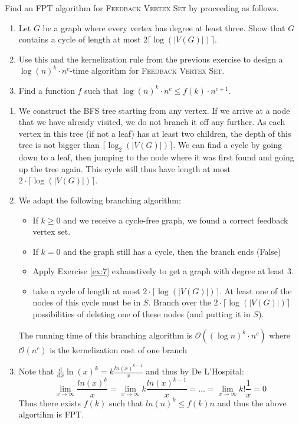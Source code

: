 \documentclass{article}
\begin{document}
\newpage
\begin{exercise}
    Find an FPT algorithm for \textsc{Feedback Vertex Set} by proceeding as follows.\begin{enumerate}
        \item Let $G$ be a graph where every vertex has degree at least three. Show that $G$ contains a cycle of length at most $2\lceil\log(|V(G)|)\rceil$.
        \item Use this and the kernelization rule from the previous exercise to design a $\log(n)^k\cdot n^c$-time algorithm for \textsc{Feedback Vertex Set}.
        \item Find a function $f$ such that $\log(n)^k\cdot n^c\leq f(k)\cdot n^{c+1}$.
    \end{enumerate}
\end{exercise}
\begin{solving}
    \begin{enumerate}
        \item We construct the BFS tree starting from any vertex. If we arrive at a node that we have already visited, we do not branch it off any further. As each vertex in this tree (if not a leaf) has at least two children, the depth of this tree is not bigger than $\lceil\log_2(|V(G)|)\rceil$. We can find a cycle by going down to a leaf, then jumping to the node where it was first found and going up the tree again. This cycle will thus have length at most  $2\cdot\lceil\log(|V(G)|)\rceil$.
        \item We adapt the following branching algorithm:
        \begin{itemize}
            \item If $k\geq 0$ and we receive a cycle-free graph, we found a correct feedback vertex set.
            \item If $k= 0$ and the graph still has a cycle, then the branch ends (False)
            \item Apply Exercise \ref{ex:7} exhaustively to get a graph with degree at least $3$.
            \item take a cycle of length at most $2\cdot\lceil\log(|V(G)|)\rceil$. At least one of the nodes of this cycle must be in $S$. Branch over the $2\cdot\lceil\log(|V(G)|)\rceil$ possibilities of deleting one of these nodes (and putting it in $S$).
        \end{itemize}
        The running time of this branching algorithm is $\mathcal O((\log n)^k\cdot n^c)$ where $\mathcal O(n^c)$ is the kernelization cost of one branch
        \item Note that $\frac{\mathrm d}{\mathrm dx} \ln(x)^k = k\frac{ln(x)^{k-1}}{x}$ and thus by De L'Hospital: \begin{equation*}
            \lim_{x\to \infty}\frac{ln(x)^k}{x} = \lim_{x\to \infty}k\frac{ln(x)^{k-1}}{x} =\dots = \lim_{x\to \infty}k!\frac{1}{x} = 0
        \end{equation*}
        Thus there exists $f(k)$ such that $ln(n)^k \leq f(k)n$ and thus the above algortihm is FPT.
    \end{enumerate}
\end{solving}
\end{document}
